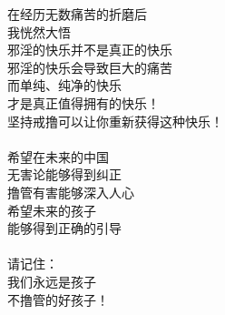 \begin{poem}[中国戒撸往事]
\begin{multicols}{2}
        在经历无数痛苦的折磨后 \\ 我恍然大悟 \\ 邪淫的快乐并不是真正的快乐 \\ 邪淫的快乐会导致巨大的痛苦 \\ 而单纯、纯净的快乐 \\ 才是真正值得拥有的快乐！ \\ 坚持戒撸可以让你重新获得这种快乐！ \\~\\
        希望在未来的中国 \\ 无害论能够得到纠正 \\ 撸管有害能够深入人心 \\ 希望未来的孩子 \\ 能够得到正确的引导 \\~\\
        请记住： \\ 我们永远是孩子 \\ 不撸管的好孩子！
    \end{multicols}
\end{poem}
